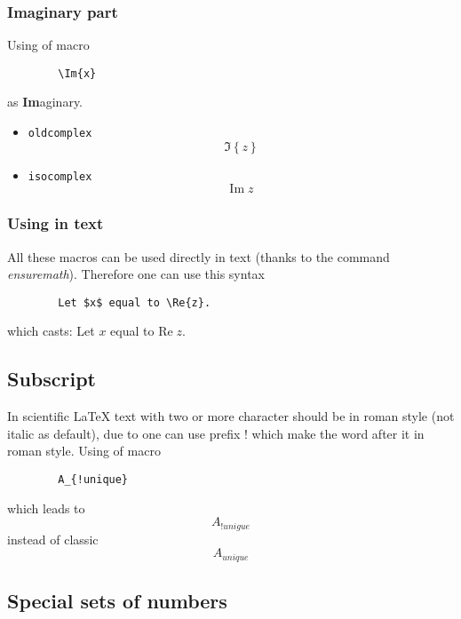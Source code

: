 \documentclass{article}
\begin{document}
		\subsubsection*{Imaginary part}
		Using of macro
		\begin{lstlisting}
		\Im{x}
		\end{lstlisting}
		as \textbf{Im}aginary.
		
		\begin{itemize}
			\item \texttt{oldcomplex}
			\begin{equation*}
				\Im\left\{z\right\}
			\end{equation*}
			\item \texttt{isocomplex}
			\begin{equation*}
				\mathrm{Im}\; z
			\end{equation*}
		\end{itemize}
	
		\subsubsection*{Using in text}
		All these macros can be used directly in text (thanks to the command \textit{ensuremath}). Therefore one can use this syntax
		\begin{lstlisting}
		Let $x$ equal to \Re{z}.
		\end{lstlisting}
		which casts: Let $x$ equal to $\mathrm{Re}\;z$.
	
	\subsection*{Subscript}
	In scientific \LaTeX{} text with two or more character should be in roman style (not italic as default), due to one can use prefix ! which make the word after it in roman style. Using of macro
	\begin{lstlisting}
		A_{!unique}
	\end{lstlisting}
	which leads to
	\begin{equation*}
		A_{!unigue}
	\end{equation*}
	instead of classic
	\begin{equation*}
		A_{unique}
	\end{equation*}
	
	\subsection*{Special sets of numbers}
	
\end{document}
